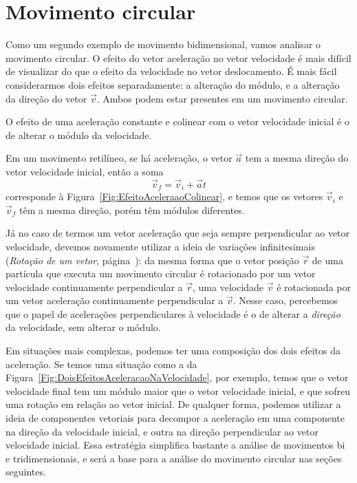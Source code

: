 \section{Movimento circular}
\label{Sec:MovimentoCircular}

Como um segundo exemplo de movimento bidimensional, vamos analisar o movimento circular. O efeito do vetor aceleração no vetor velocidade é mais difícil de visualizar do que o efeito da velocidade no vetor deslocamento. É mais fácil considerarmos dois efeitos separadamente: a alteração do módulo, e a alteração da direção do vetor $\vec{v}$. Ambos podem estar presentes em um movimento circular.

\begin{marginfigure}
\centering
{}
\caption{O efeito de uma aceleração constante e colinear com o vetor velocidade inicial é o de alterar o módulo da velocidade.\label{Fig:EfeitoAceleraaoColinear}}
\end{marginfigure}

Em um movimento retilíneo, se há aceleração, o vetor $\vec{a}$ tem a mesma direção do vetor velocidade inicial, então a soma
\begin{equation}
    \vec{v}_f = \vec{v}_i + \vec{a} t
\end{equation}
%
corresponde à Figura~\ref{Fig:EfeitoAceleraaoColinear}, e temos que os vetores $\vec{v}_i$ e $\vec{v}_f$ têm a mesma direção, porém têm módulos diferentes.

Já no caso de termos um vetor aceleração que seja sempre perpendicular ao vetor velocidade, devemos novamente utilizar a ideia de variações infinitesimais (\emph{Rotação de um vetor}, página~\pageref{Disc:RotVetor}): da mesma forma que o vetor posição $\vec{r}$ de uma partícula que executa um movimento circular é rotacionado por um vetor velocidade continuamente perpendicular a $\vec{r}$, uma velocidade $\vec{v}$ é rotacionada por um vetor aceleração continuamente perpendicular a $\vec{v}$. Nesse caso, percebemos que o papel de acelerações perpendiculares à velocidade é o de alterar a \emph{direção} da velocidade, sem alterar o módulo.

Em situações mais complexas, podemos ter uma composição dos dois efeitos da aceleração. Se temos uma situação como a da Figura~\ref{Fig:DoisEfeitosAceleracaoNaVelocidade}, por exemplo, temos que o vetor velocidade final tem um módulo maior que o vetor velocidade inicial, e que sofreu uma rotação em relação ao vetor inicial. De qualquer forma, podemos utilizar a ideia de componentes vetoriais para decompor a aceleração em uma componente na direção da velocidade inicial, e outra na direção perpendicular ao vetor velocidade inicial. Essa estratégia simplifica bastante a análise de movimentos bi e tridimensionais, e será a base para a análise do movimento circular nas seções seguintes.

